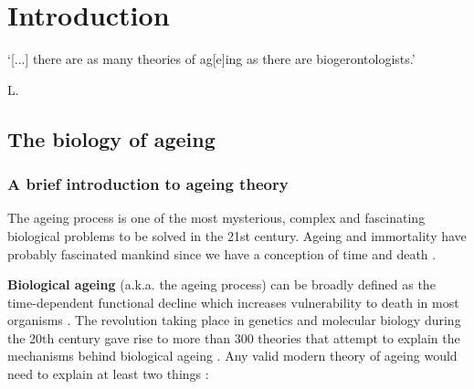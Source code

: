 
\chapter{Introduction}  \label{c:1} %

\ifpdf
    \graphicspath{{Chapter1/Figs/Raster/}{Chapter1/Figs/PDF/}{Chapter1/Figs/}}
\else
    \graphicspath{{Chapter1/Figs/Vector/}{Chapter1/Figs/}}
\fi



\epigraph{`[...] there are as many theories of ag[e]ing as there are biogerontologists.'}{L. \citet{Hayflick2007}}

\section{The biology of ageing} %

\subsection{A brief introduction to ageing theory}

The ageing process is one of the most mysterious, complex and fascinating biological problems to be solved in the 21st century. Ageing and immortality have probably fascinated mankind since we have a conception of time and death \citep{Renfrew2016}. 

\bigskip

\textbf{Biological ageing} (\acrshort{a.k.a.} the ageing process) can be broadly defined as the time-dependent functional decline which increases vulnerability to death in most organisms \citep{Lopez-Otin2013}. The revolution taking place in genetics and molecular biology during the 20th century gave rise to more than 300 theories that attempt to explain the mechanisms behind biological ageing \citep{Medvedev1990}. Any valid modern theory of ageing would need to explain at least two things \citep{Medvedev1990}:

